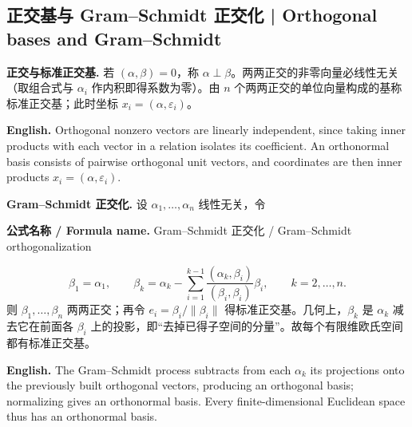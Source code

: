 \documentclass[UTF8,11pt,a4paper]{ctexart}
\newcommand{\EN}[1]{\par\noindent\textbf{English.} #1\par}
\newcommand{\FORMULA}[2]{\par\noindent\textbf{公式名称 / Formula name.} #1 / #2\par}
\begin{document}
\subsection{正交基与 Gram--Schmidt 正交化 | Orthogonal bases and Gram--Schmidt}
\noindent\textbf{正交与标准正交基.} 若 $(\alpha,\beta)=0$，称 $\alpha\perp\beta$。两两正交的非零向量必线性无关（取组合式与 $\alpha_i$ 作内积即得系数为零）。由 $n$ 个两两正交的单位向量构成的基称标准正交基；此时坐标 $x_i=(\alpha,\varepsilon_i)$。
\EN{Orthogonal nonzero vectors are linearly independent, since taking inner products with each vector in a relation isolates its coefficient. An orthonormal basis consists of pairwise orthogonal unit vectors, and coordinates are then inner products $x_i=(\alpha,\varepsilon_i)$.}
\noindent\textbf{Gram--Schmidt 正交化.} 设 $\alpha_1,\dots,\alpha_n$ 线性无关，令
\FORMULA{Gram--Schmidt 正交化}{Gram--Schmidt orthogonalization}
\[
\beta_1=\alpha_1,\qquad \beta_k=\alpha_k-\sum_{i=1}^{k-1}\frac{(\alpha_k,\beta_i)}{(\beta_i,\beta_i)}\beta_i,\qquad k=2,\dots,n.
\]
则 $\beta_1,\dots,\beta_n$ 两两正交；再令 $e_i=\beta_i/\|\beta_i\|$ 得标准正交基。几何上，$\beta_k$ 是 $\alpha_k$ 减去它在前面各 $\beta_i$ 上的投影，即“去掉已得子空间的分量”。故每个有限维欧氏空间都有标准正交基。
\EN{The Gram--Schmidt process subtracts from each $\alpha_k$ its projections onto the previously built orthogonal vectors, producing an orthogonal basis; normalizing gives an orthonormal basis. Every finite-dimensional Euclidean space thus has an orthonormal basis.}
\end{document}
